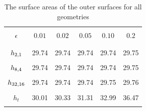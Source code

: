 \begin{table}
\begin{center}
\begin{tabular}{  c c c c c c  }
\hline
\hline
 & & &  &&  \\
$\epsilon$ &$0.01$ &$0.02$ & $0.05$ &$0.10$ & $0.2$ \\
 & & &  &&  \\
\hline
 & & &  &&  \\
$h_{2,1}$& 29.74 &29.74 &29.74 &29.74 &29.75 \\
 & & &  &&  \\
$h_{8,4}$& 29.74 &29.74 &29.74 &29.74 &29.75 \\
 & & &  &&  \\
$h_{32,16}$&29.74 &29.74 &29.74 &29.75 &29.76 \\
 & & &  &&  \\
$h_{t}$& 30.01 &30.33 &31.31 &32.99 &36.47 \\
 & & &  &&  \\
\hline
\hline
\end{tabular}
\end{center}
\caption[Model topography surface areas]{The surface areas of the outer surfaces for all geometries}
\label{t:sa}
\end{table}




